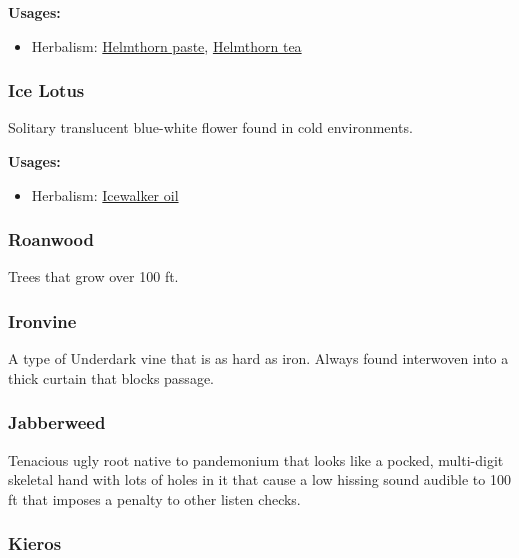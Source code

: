 \vspace{5mm}

\textbf{Usages:}

\begin{itemize}[noitemsep]
\item[] Herbalism: \hyperref[Helmthorn paste]{Helmthorn paste}, \hyperref[Helmthorn tea]{Helmthorn tea}
\end{itemize}

\subsubsection{Ice Lotus}
\label{Ice Lotus}

Solitary translucent blue-white flower found in cold environments.

\vspace{5mm}

\textbf{Usages:}

\begin{itemize}[noitemsep]
\item[] Herbalism: \hyperref[Icewalker oil]{Icewalker oil}
\end{itemize}

\subsubsection{Roanwood}

Trees that grow over 100 ft.

\subsubsection{Ironvine}

A type of Underdark vine that is as hard as iron. Always found interwoven into a thick curtain that blocks passage.

\subsubsection{Jabberweed}

Tenacious ugly root native to pandemonium that looks like a pocked, multi-digit skeletal hand with lots of holes in it that cause a low hissing sound audible to 100 ft that imposes a penalty to other listen checks. 

\subsubsection{Kieros}
\label{Kieros}

